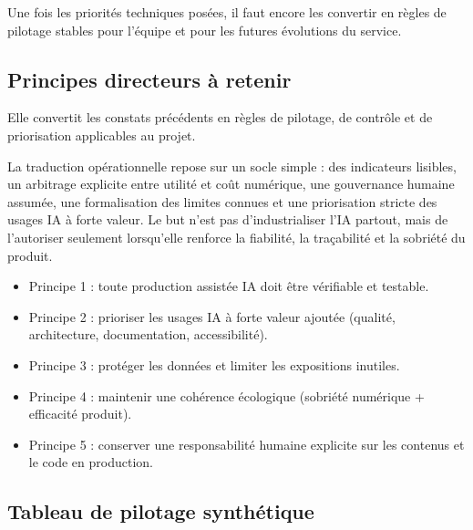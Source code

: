 \documentclass[
  10pt,
  a4paper,
  DIV=11,
  numbers=noendperiod,
  oneside]{scrreprt}
\providecommand{\tightlist}{%
  \setlength{\itemsep}{0pt}\setlength{\parskip}{0pt}}
\begin{document}
Une fois les priorités techniques posées, il faut encore les convertir
en règles de pilotage stables pour l'équipe et pour les futures
évolutions du service.

\subsection{Principes directeurs à
retenir}\label{principes-directeurs-uxe0-retenir}

Elle convertit les constats précédents en règles de pilotage, de
contrôle et de priorisation applicables au projet.

La traduction opérationnelle repose sur un socle simple : des
indicateurs lisibles, un arbitrage explicite entre utilité et coût
numérique, une gouvernance humaine assumée, une formalisation des
limites connues et une priorisation stricte des usages IA à forte
valeur. Le but n'est pas d'industrialiser l'IA partout, mais de
l'autoriser seulement lorsqu'elle renforce la fiabilité, la traçabilité
et la sobriété du produit.

\begin{itemize}
\tightlist
\item
  Principe 1 : toute production assistée IA doit être vérifiable et
  testable.
\item
  Principe 2 : prioriser les usages IA à forte valeur ajoutée (qualité,
  architecture, documentation, accessibilité).
\item
  Principe 3 : protéger les données et limiter les expositions inutiles.
\item
  Principe 4 : maintenir une cohérence écologique (sobriété numérique +
  efficacité produit).
\item
  Principe 5 : conserver une responsabilité humaine explicite sur les
  contenus et le code en production.
\end{itemize}

\subsection{Tableau de pilotage
synthétique}\label{tableau-de-pilotage-synthuxe9tique}
\end{document}
